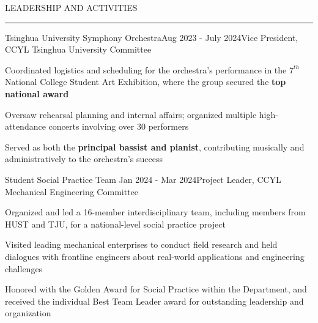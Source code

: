 \documentclass{resume} %
\renewenvironment{rSection}[1]{
\sectionskip
\textcolor{TsinghuaPurple}{\MakeUppercase{#1}}
\sectionlineskip
\hrule
\begin{list}{}{
\setlength{\leftmargin}{0em}
}
\item[]
}{
\end{list}
}
\begin{document}
 \begin{rSection}{LEADERSHIP AND ACTIVITIES}

    \begin{rSubsection}{Tsinghua University Symphony Orchestra}{Aug 2023 - July 2024}{Vice President, CCYL Tsinghua University Committee}{}              
    \item Coordinated logistics and scheduling for the orchestra's performance in the $7^{th}$ National College Student Art Exhibition, where the group secured the \textbf{top national award}
    \item Oversaw rehearsal planning and internal affairs; organized multiple high-attendance concerts involving over 30 performers
    \item Served as both the \textbf{principal bassist and pianist}, contributing musically and administratively to the orchestra’s success
    \end{rSubsection}  
    
    \begin{rSubsection}{Student Social Practice Team} {Jan 2024 - Mar 2024}{Project Leader, CCYL Mechanical Engineering Committee}{} 
    \item Organized and led a 16-member interdisciplinary team, including members from HUST and TJU, for a national-level social practice project
    \item Visited leading mechanical enterprises to conduct field research and held dialogues with frontline engineers about real-world applications and engineering challenges
    \item Honored with the Golden Award for Social Practice within the Department, and received the individual Best Team Leader award for outstanding leadership and organization
    \end{rSubsection}
    
    \end{rSection}
    



 
\end{document}
